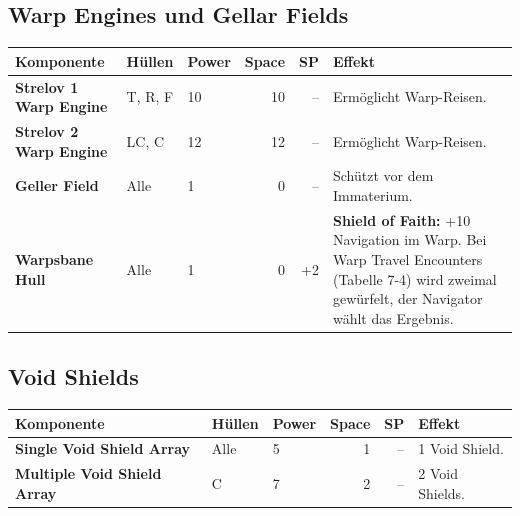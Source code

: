 \documentclass[9pt,a4paper]{extarticle}
\newcommand{\plus}[1]{\textcolor{good}{#1}}
\newcommand{\nm}[1]{\textbf{#1}}
\newcommand{\eff}[1]{\textbf{#1:}}
\begin{document}
\subsection{Warp Engines und Gellar Fields}
\begin{xltabular}{\linewidth}{l H P N N Y}
\toprule
{}\textbf{Komponente} & \textbf{Hüllen} & \textbf{Power} & \textbf{Space} & \textbf{SP} & \textbf{Effekt}\\
\midrule
\endhead
\nm{Strelov 1 Warp Engine} & T, R, F & 10 & 10 & – & Ermöglicht Warp-Reisen.\\
\nm{Strelov 2 Warp Engine} & LC, C & 12 & 12 & – & Ermöglicht Warp-Reisen.\\
\nm{Geller Field} & Alle & 1 & 0 & – & Schützt vor dem Immaterium.\\
\nm{Warpsbane Hull} & Alle & 1 & 0 & +2 & \eff{Shield of Faith} \plus{+10 Navigation} im Warp. Bei Warp Travel Encounters (Tabelle 7-4) wird zweimal gewürfelt, der Navigator wählt das Ergebnis.\\
\bottomrule
\end{xltabular}

\subsection{Void Shields}
\begin{xltabular}{\linewidth}{l H P N N Y}
\toprule
{}\textbf{Komponente} & \textbf{Hüllen} & \textbf{Power} & \textbf{Space} & \textbf{SP} & \textbf{Effekt}\\
\midrule
\endhead
\nm{Single Void Shield Array} & Alle & 5 & 1 & – & 1 Void Shield.\\
\nm{Multiple Void Shield Array} & C & 7 & 2 & – & 2 Void Shields.\\
\bottomrule
\end{xltabular}
\end{document}

